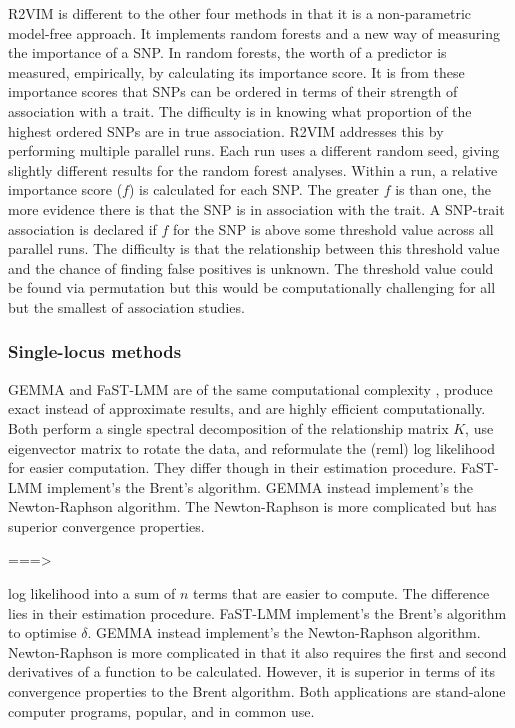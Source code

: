 \documentclass{article}
\begin{document}
  
R2VIM is different to the other four methods in that it is a non-parametric model-free approach. It implements  
random forests and a new way of measuring the importance of a SNP.  
In random forests, the worth of a predictor is measured, empirically, by calculating its importance score. 
It is from these importance scores that SNPs can be ordered in terms of their strength of association with a trait. 
The difficulty is in knowing what proportion of the 
highest ordered SNPs are in true association. R2VIM addresses this by performing multiple parallel runs. Each run uses a different 
random seed, giving slightly different results for the random forest analyses. Within a run, a relative importance score ($f$) is calculated for 
each SNP. The greater $f$ is than one, the more evidence there is that the SNP is in association with the trait.  A SNP-trait association is 
declared if $f$ for the SNP is above some threshold value across all parallel runs. The difficulty is that the relationship between 
this threshold value and the chance of finding false positives is unknown.  The threshold value could be found via permutation but 
this would be computationally challenging for all but the smallest of association studies. 


\subsubsection{Single-locus methods}


GEMMA \cite{zhou2012genome} and FaST-LMM \cite{lippert2011fast} are of  the same computational complexity \cite{zhou2012genome}, produce exact instead of approximate results, and are highly efficient computationally.  Both perform a single spectral decomposition of the relationship matrix $K$, use  eigenvector matrix to rotate the data, 
and reformulate the (reml) log likelihood for easier computation.  They differ though in their estimation procedure. 
FaST-LMM implement's the Brent's algorithm. GEMMA instead implement's the Newton-Raphson algorithm. The  Newton-Raphson is more complicated  but has superior 
convergence properties. 

===>


log likelihood into a sum of $n$ terms that are easier to compute. The difference lies in their estimation procedure. FaST-LMM implement's the Brent's algorithm to optimise $\delta$. GEMMA instead implement's the Newton-Raphson algorithm. Newton-Raphson is more complicated in that it also requires the first and second derivatives of a function to be calculated. However, it is superior in terms of its convergence properties to the Brent algorithm.  Both applications are stand-alone computer programs, popular, and in common use.
\end{document}
